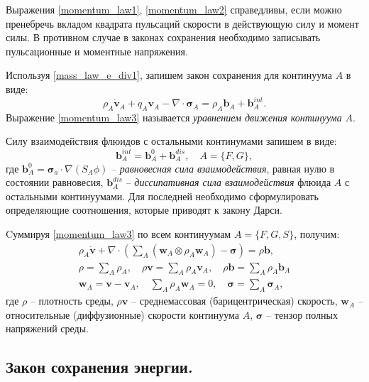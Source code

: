 	Выражения \eqref{momentum_law1}, \eqref{momentum_law2} справедливы, если можно пренебречь вкладом квадрата пульсаций скорости в действующую силу и момент силы. В противном случае в законах сохранения необходимо записывать пульсационные и моментные напряжения.

	Используя \eqref{mass_law_e_div1}, запишем закон сохранения для континуума $A$ в виде:
\begin{equation}
	\label{momentum_law3}
	\rho_A \dot{\boldsymbol{v}}_A + q_A \boldsymbol{v}_A - \nabla \cdot \boldsymbol{\sigma}_A = \rho_A\boldsymbol{b}_A + \boldsymbol{b}_A^{int}.
\end{equation}
	Выражение \eqref{momentum_law3} называется \textit{уравнением движения континуума} $A$.

	Силу взаимодействия флюидов с остальными континумами запишем в виде:
\begin{equation}
	\label{int_force}
	\boldsymbol{b}_A^{int} = \boldsymbol{b}_A^0 + \boldsymbol{b}_A^{dis}, \quad A = \{F, G\},
\end{equation}
	где $\boldsymbol{b}_A^0 = \boldsymbol{\sigma}_a \cdot \nabla (S_A\phi)$ -- \textit{равновесная сила взаимодействия}, равная нулю в состоянии равновесия, $\boldsymbol{b}_A^{dis}$ -- \textit{диссипативная сила взаимодействия} флюида $A$ с остальными континуумами. Для последней необходимо сформулировать определяющие соотношения, которые приводят к закону Дарси.
	
	Cуммируя \eqref{momentum_law3} по всем континуумам $A = \{F, G, S\}$, получим:
\begin{align}
	\label{momentum_law_full}
	\rho_A \dot{\boldsymbol{v}} + \nabla \cdot \left(\sum\limits_{A}\left(\boldsymbol{w}_A \otimes \rho_A\boldsymbol{w}_A\right) -\boldsymbol{\sigma}\right) = \rho \boldsymbol{b},\\
	\rho = \sum\limits_{A} \rho_A, \quad \rho\boldsymbol{v}=\sum\limits_{A}\rho_A\boldsymbol{v}_A, \quad 
	\rho\boldsymbol{b}=\sum\limits_{A}\rho_A\boldsymbol{b}_A\\
	\boldsymbol{w}_A = \boldsymbol{v} - \boldsymbol{v}_A, \quad \sum\limits_A \rho_A\boldsymbol{w}_A = 0, \quad
	\boldsymbol{\sigma} = \sum\limits_{A} \boldsymbol{\sigma}_A,
\end{align}
	где $\rho$ -- плотность среды, $\rho\boldsymbol{v}$ -- среднемассовая (барицентрическая) скорость,
	$\boldsymbol{w}_A$ -- относительные (диффузионные) скорости континуума $A$,
	$\boldsymbol{\sigma}$ -- тензор полных напряжений среды.
	
\subsection{Закон сохранения энергии.}

